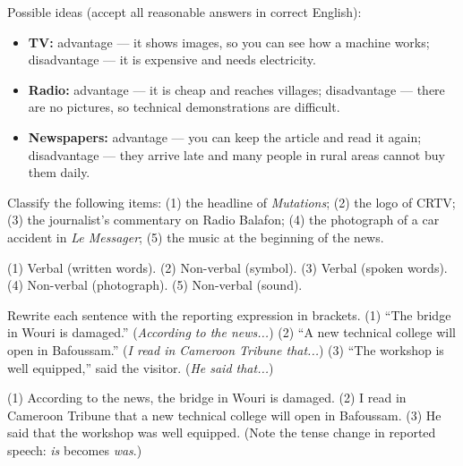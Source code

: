 \documentclass[11pt]{article}
\begin{document}
\begin{corrige}
Possible ideas (accept all reasonable answers in correct English):
\begin{itemize}
\item \textbf{TV:} advantage --- it shows images, so you can see how a machine works; disadvantage --- it is expensive and needs electricity.
\item \textbf{Radio:} advantage --- it is cheap and reaches villages; disadvantage --- there are no pictures, so technical demonstrations are difficult.
\item \textbf{Newspapers:} advantage --- you can keep the article and read it again; disadvantage --- they arrive late and many people in rural areas cannot buy them daily.
\end{itemize}
\end{corrige}

\begin{exercice}
Classify the following items: (1) the headline of \emph{Mutations}; (2) the logo of CRTV; (3) the journalist's commentary on Radio Balafon; (4) the photograph of a car accident in \emph{Le Messager}; (5) the music at the beginning of the news.
\end{exercice}

\begin{corrige}
(1) Verbal (written words). (2) Non-verbal (symbol). (3) Verbal (spoken words). (4) Non-verbal (photograph). (5) Non-verbal (sound).
\end{corrige}

\begin{exercice}
Rewrite each sentence with the reporting expression in brackets. (1) ``The bridge in Wouri is damaged.'' (\emph{According to the news...}) (2) ``A new technical college will open in Bafoussam.'' (\emph{I read in Cameroon Tribune that...}) (3) ``The workshop is well equipped,'' said the visitor. (\emph{He said that...})
\end{exercice}

\begin{corrige}
(1) According to the news, the bridge in Wouri is damaged. (2) I read in Cameroon Tribune that a new technical college will open in Bafoussam. (3) He said that the workshop was well equipped. (Note the tense change in reported speech: \emph{is} becomes \emph{was}.)
\end{corrige}
\end{document}
